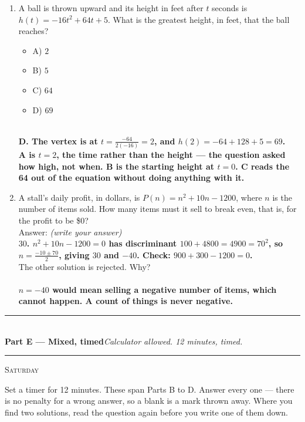\documentclass[11pt,a4paper]{article}
\newif\ifANSWERS
\newcommand{\PartHead}[2]{%
  \vspace{6pt}
  {\color{navy}\rule{\textwidth}{0.8pt}}\\[2pt]
  {\large\bfseries\color{navy}#1}\hfill{\small\itshape #2}\\[-4pt]
  {\color{navy}\rule{\textwidth}{0.4pt}}
  \vspace{4pt}
}
\newcommand{\sitting}[1]{{\footnotesize\textsc{\color{navy}#1}}\par\vspace{2pt}}
\newcommand{\spr}{\\[3pt]\hspace*{6pt}Answer: \underline{\hspace{3.2cm}}\hfill{\footnotesize\itshape(write your answer)}}
\newcommand{\ans}[1]{\ {\color{keyred}\bfseries #1}}
\newcommand{\ans}[1]{}
\newenvironment{choices}
  {\par\nopagebreak\begin{itemize}[label={},leftmargin=16pt,itemsep=0pt,topsep=2pt,parsep=0pt,%
     beginpenalty=10000,midpenalty=10000]}
  {\end{itemize}}
\begin{document}
\begin{enumerate}[leftmargin=20pt,itemsep=10pt]
\ifANSWERS\else\newpage\fi
\item A ball is thrown upward and its height in feet after $t$ seconds is
  $h(t)=-16t^2+64t+5$. What is the greatest height, in feet, that the ball reaches?
  \begin{choices}
  \item A) $2$
  \item B) $5$
  \item C) $64$
  \item D) $69$
  \end{choices}
  \ans{\\ D. The vertex is at $t=\frac{-64}{2(-16)}=2$, and $h(2)=-64+128+5=69$. \\ A is $t=2$, the time rather than the height --- the question asked how high, not when. B is the starting height at $t=0$. C reads the 64 out of the equation without doing anything with it.}

\item A stall's daily profit, in dollars, is $P(n)=n^2+10n-1200$, where $n$ is the
  number of items sold. How many items must it sell to break even, that is, for the
  profit to be \$0? \spr
  \ans{\\ $30$. $n^2+10n-1200=0$ has discriminant $100+4800=4900=70^2$, so $n=\frac{-10\pm70}{2}$, giving $30$ and $-40$. Check: $900+300-1200=0$.}\\[2pt]
  The other solution is rejected. Why?\ifANSWERS\else\\
  \underline{\hspace{\linewidth}}\fi
  \ans{\\ $n=-40$ would mean selling a negative number of items, which cannot happen. A count of things is never negative.}
\end{enumerate}

\PartHead{Part E --- Mixed, timed}{Calculator allowed. 12 minutes, timed.}
\sitting{Saturday}
Set a timer for 12 minutes. These span Parts B to D. Answer every one --- there is no
penalty for a wrong answer, so a blank is a mark thrown away. Where you find two
solutions, read the question again before you write one of them down.
\end{document}
